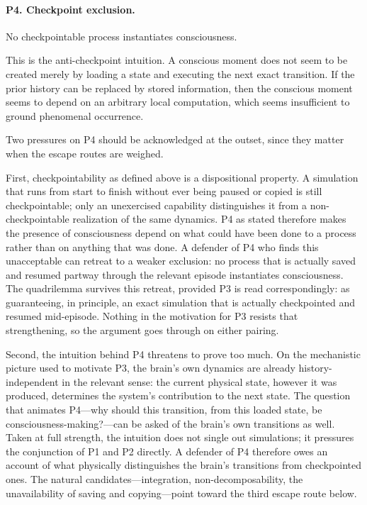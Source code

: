 \documentclass[11pt]{article}
\begin{document}
\paragraph{P4. Checkpoint exclusion.}
No checkpointable process instantiates consciousness.

This is the anti-checkpoint intuition. A conscious moment does not seem to be
created merely by loading a state and executing the next exact transition. If
the prior history can be replaced by stored information, then the conscious
moment seems to depend on an arbitrary local computation, which seems
insufficient to ground phenomenal occurrence.

Two pressures on P4 should be acknowledged at the outset, since they matter
when the escape routes are weighed.

First, checkpointability as defined above is a dispositional property. A
simulation that runs from start to finish without ever being paused or copied
is still checkpointable; only an unexercised capability distinguishes it from
a non-checkpointable realization of the same dynamics. P4 as stated therefore
makes the presence of consciousness depend on what could have been done to a
process rather than on anything that was done. A defender of P4 who finds this
unacceptable can retreat to a weaker exclusion: no process that is actually
saved and resumed partway through the relevant episode instantiates
consciousness. The quadrilemma survives this retreat, provided P3 is read
correspondingly: as guaranteeing, in principle, an exact simulation that is
actually checkpointed and resumed mid-episode. Nothing in the motivation for
P3 resists that strengthening, so the argument goes through on either pairing.

Second, the intuition behind P4 threatens to prove too much. On the
mechanistic picture used to motivate P3, the brain's own dynamics are already
history-independent in the relevant sense: the current physical state, however
it was produced, determines the system's contribution to the next state. The
question that animates P4---why should this transition, from this loaded
state, be consciousness-making?---can be asked of the brain's own transitions
as well. Taken at full strength, the intuition does not single out
simulations; it pressures the conjunction of P1 and P2 directly. A defender of
P4 therefore owes an account of what physically distinguishes the brain's
transitions from checkpointed ones. The natural candidates---integration,
non-decomposability, the unavailability of saving and copying---point toward
the third escape route below.
\end{document}
